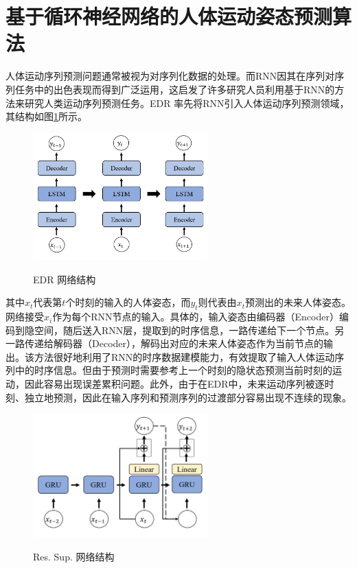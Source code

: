 \section{基于循环神经网络的人体运动姿态预测算法}
人体运动序列预测问题通常被视为对序列化数据的处理。而RNN因其在序列对序列任务中的出色表现而得到广泛运用，这启发了许多研究人员利用基于RNN的方法来研究人类运动序列预测任务。EDR \parencite{fragkiadaki2015recurrent} 率先将RNN引入人体运动序列预测领域，其结构如图\ref{fig:EDR}所示。
\begin{figure}[ht]
    \centering
    \includegraphics[width=0.6\textwidth]{FigMa/EDR.png}\\
    \vspace{-0.3cm}
    \caption{EDR 网络结构}
    \label{fig:EDR}
\end{figure}
其中$x_t$代表第$t$个时刻的输入的人体姿态，而$y_t$则代表由$x_t$预测出的未来人体姿态。网络接受$x_i$作为每个RNN节点的输入。具体的，输入姿态由编码器（Encoder）编码到隐空间，随后送入RNN层，提取到的时序信息，一路传递给下一个节点。另一路传递给解码器（Decoder），解码出对应的未来人体姿态作为当前节点的输出。该方法很好地利用了RNN的时序数据建模能力，有效提取了输入人体运动序列中的时序信息。但由于预测时需要参考上一个时刻的隐状态预测当前时刻的运动，因此容易出现误差累积问题。此外，由于在EDR中，未来运动序列被逐时刻、独立地预测，因此在输入序列和预测序列的过渡部分容易出现不连续的现象。
\begin{figure}[ht]
    \centering
    \includegraphics[width=0.6\textwidth]{FigMa/ResSup.png}\\
    \vspace{-0.3cm}
    \caption{Res. Sup. 网络结构}
    \label{fig:ResSup}
\end{figure}
